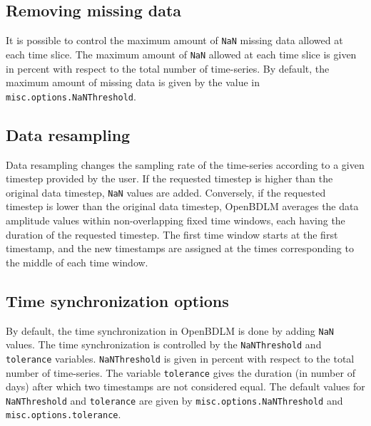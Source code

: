 \subsection{Removing missing data}
\label{SS:MissingDataRemoval}

It is possible to control the maximum amount of \lstinline[basicstyle = \mlttfamily \small ]!NaN! missing data allowed at each time slice. 
The maximum amount of \lstinline[basicstyle = \mlttfamily \small ]!NaN! allowed at each time slice is given in percent with respect to the total number of time-series.
By default, the maximum amount of missing data is given by the value in \lstinline[basicstyle = \mlttfamily \small ]!misc.options.NaNThreshold!.

\subsection{Data resampling}
\label{SS:DataResampling}
Data resampling changes the sampling rate of the time-series according to a given timestep provided by the user. 
If the requested timestep is higher than the original data timestep, \lstinline[basicstyle = \mlttfamily \small ]!NaN! values are added.
Conversely, if the requested timestep is lower than the original  data timestep, OpenBDLM averages the data amplitude values within non-overlapping fixed time windows, each having the duration of the requested timestep.
The first time window starts at the first timestamp, and the new timestamps are assigned at the times corresponding to the middle of each time window.

\subsection{Time synchronization options}
\label{SS:synchronization}
By default, the time synchronization in OpenBDLM is done by adding \lstinline[basicstyle = \mlttfamily \small ]!NaN! values.
The time synchronization is controlled by the \lstinline[basicstyle = \mlttfamily \small ]!NaNThreshold! and \lstinline[basicstyle = \mlttfamily \small ]!tolerance! variables.
\lstinline[basicstyle = \mlttfamily \small ]!NaNThreshold!  is given in percent with respect to the total number of time-series.
The variable \lstinline[basicstyle = \mlttfamily \small ]!tolerance! gives the duration (in number of days) after which two timestamps are not considered equal.
The default values for \lstinline[basicstyle = \mlttfamily \small ]!NaNThreshold!  and \lstinline[basicstyle = \mlttfamily \small ]!tolerance! are given by \lstinline[basicstyle = \mlttfamily \small ]!misc.options.NaNThreshold! and \lstinline[basicstyle = \mlttfamily \small ]!misc.options.tolerance!. %


